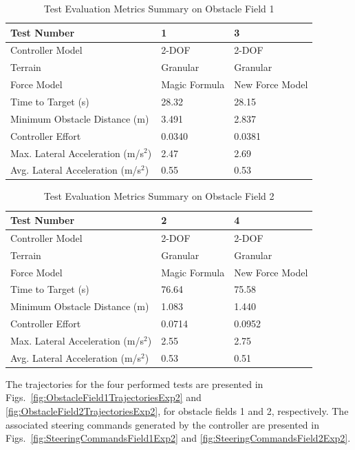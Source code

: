 \documentclass[12pt,onecolumn]{report}
\begin{document}
\begin{table}
		\centering
\begin{tabular}{ ||p{6cm}|p{3.5cm}|p{3.5cm}||  }
		\hline
		Test Number & 1 & 3 \\
		\hline
		Controller Model & 2-DOF & 2-DOF \\
		\hline
		Terrain & Granular & Granular\\
		\hline
		Force Model & Magic Formula & New Force Model\\
		\hline
		Time to Target (s)  & 28.32 & 28.15 \\ 
		\hline
		Minimum Obstacle Distance (m) & 3.491 & 2.837 \\
		\hline
		Controller Effort & 0.0340 & 0.0381 \\
		\hline
		Max. Lateral Acceleration (m/s$^{2}$)& 2.47 & 2.69 \\
		\hline
		Avg. Lateral Acceleration (m/s$^{2}$) & 0.55 & 0.53 \\
		\hline
\end{tabular}
\caption{Test Evaluation Metrics Summary on Obstacle Field 1}
\label{t:EvalMetricsObst1Exp2}
\end{table}

\begin{table}
		\centering
\begin{tabular}{ ||p{6cm}|p{3.5cm}|p{3.5cm}||  }
		\hline
		Test Number & 2 & 4 \\
		\hline
		Controller Model & 2-DOF & 2-DOF \\
		\hline
		Terrain & Granular & Granular\\
		\hline
		Force Model & Magic Formula & New Force Model\\
		\hline
		Time to Target (s)  & 76.64 & 75.58 \\ 
		\hline
		Minimum Obstacle Distance (m) & 1.083 & 1.440 \\
		\hline
		Controller Effort & 0.0714 & 0.0952 \\
		\hline
		Max. Lateral Acceleration (m/s$^{2}$)& 2.55 & 2.75 \\
		\hline
		Avg. Lateral Acceleration (m/s$^{2}$) & 0.53 & 0.51 \\
		\hline
\end{tabular}
\caption{Test Evaluation Metrics Summary on Obstacle Field 2}
\label{t:EvalMetricsObst2Exp2}
\end{table}

The trajectories for the four performed tests are presented in Figs.~\ref{fig:ObstacleField1TrajectoriesExp2} and \ref{fig:ObstacleField2TrajectoriesExp2}, for obstacle fields 1 and 2, respectively. The associated steering commands generated by the controller are presented in Figs.~\ref{fig:SteeringCommandsField1Exp2} and \ref{fig:SteeringCommandsField2Exp2}. 
\end{document}
